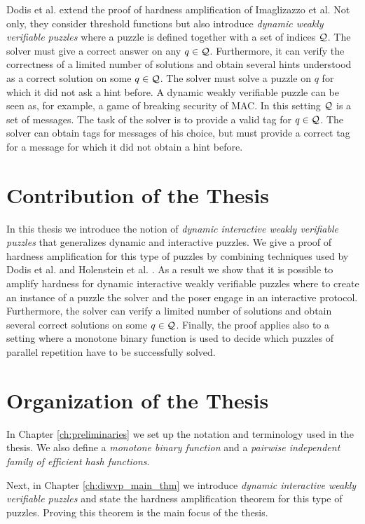 Dodis et al. \cite{dodis2009security} extend the proof of hardness amplification of Imaglizazzo et al.
Not only, they consider threshold functions but also introduce \textit{dynamic weakly verifiable puzzles} where a puzzle is defined together with a set of indices $\mathcal{Q}$.
The solver must give a correct answer on any $q \in \mathcal{Q}$. Furthermore, it can verify the correctness of a limited number of solutions and
obtain several hints understood as a correct solution on some $q \in \mathcal{Q}$. The solver must solve a puzzle on $q$ for which it did not ask a hint before.
A dynamic weakly verifiable puzzle can be seen as, for example, a game of breaking security of MAC.
In this setting $\mathcal{Q}$ is a set of messages. The task of the solver is to provide a valid tag for $q \in \mathcal{Q}$.
The solver can obtain tags for messages of his choice, but must provide a correct tag for a message for which it did not obtain a hint before.

\section{Contribution of the Thesis}
In this thesis we introduce the notion of \textit{dynamic interactive weakly verifiable puzzles} that generalizes dynamic and interactive puzzles.
We give a proof of hardness amplification for this type of puzzles by combining techniques
used by Dodis et al. \cite{dodis2009security} and Holenstein et al. \cite{holenstein2011general}.
As a result we show that it is possible to amplify hardness for dynamic interactive weakly verifiable puzzles where
to create an instance of a puzzle the solver and the poser engage in an interactive protocol.
Furthermore, the solver can verify a limited number of solutions and obtain several correct solutions on some $q \in \mathcal{Q}$.
Finally, the proof applies also to a setting where a monotone binary function is used to decide which puzzles of parallel repetition
have to be successfully solved.
%
\section{Organization of the Thesis}
In Chapter \ref{ch:preliminaries} we set up the notation and terminology used in the thesis.
We also define a \textit{monotone binary function} and a \textit{pairwise independent family of efficient hash functions}.

Next, in Chapter \ref{ch:diwvp_main_thm} we introduce \textit{dynamic interactive weakly verifiable
puzzles} and state the hardness amplification theorem for this type of puzzles.
Proving this theorem is the main focus of the thesis.

